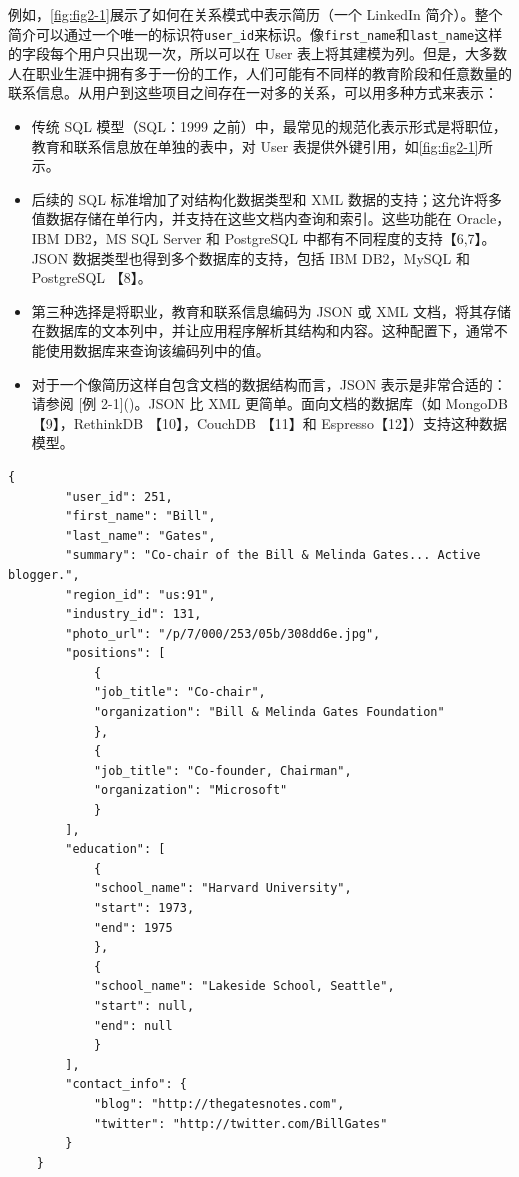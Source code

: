 例如，\autoref{fig:fig2-1}展示了如何在关系模式中表示简历（一个 LinkedIn 简介）。整个简介可以通过一个唯一的标识符\texttt{user\_id}来标识。像\texttt{first\_name}和\texttt{last\_name}这样的字段每个用户只出现一次，所以可以在 User 表上将其建模为列。但是，大多数人在职业生涯中拥有多于一份的工作，人们可能有不同样的教育阶段和任意数量的联系信息。从用户到这些项目之间存在一对多的关系，可以用多种方式来表示：

\begin{itemize}
    \item 传统 SQL 模型（SQL：1999 之前）中，最常见的规范化表示形式是将职位，教育和联系信息放在单独的表中，对 User 表提供外键引用，如\autoref{fig:fig2-1}所示。
    \item 后续的 SQL 标准增加了对结构化数据类型和 XML 数据的支持；这允许将多值数据存储在单行内，并支持在这些文档内查询和索引。这些功能在 Oracle，IBM DB2，MS SQL Server 和 PostgreSQL 中都有不同程度的支持【6,7】。JSON 数据类型也得到多个数据库的支持，包括 IBM DB2，MySQL 和 PostgreSQL 【8】。
    \item 第三种选择是将职业，教育和联系信息编码为 JSON 或 XML 文档，将其存储在数据库的文本列中，并让应用程序解析其结构和内容。这种配置下，通常不能使用数据库来查询该编码列中的值。
    \item 对于一个像简历这样自包含文档的数据结构而言，JSON 表示是非常合适的：请参阅 [例 2-1]()。JSON 比 XML 更简单。面向文档的数据库（如 MongoDB 【9】，RethinkDB 【10】，CouchDB 【11】和 Espresso【12】）支持这种数据模型。
\end{itemize}

\begin{lstlisting}[caption={用 JSON 文档表示一个 LinkedIn 简介}, breaklines]
    {
        "user_id": 251,
        "first_name": "Bill",
        "last_name": "Gates",
        "summary": "Co-chair of the Bill & Melinda Gates... Active blogger.",
        "region_id": "us:91",
        "industry_id": 131,
        "photo_url": "/p/7/000/253/05b/308dd6e.jpg",
        "positions": [
            {
            "job_title": "Co-chair",
            "organization": "Bill & Melinda Gates Foundation"
            },
            {
            "job_title": "Co-founder, Chairman",
            "organization": "Microsoft"
            }
        ],
        "education": [
            {
            "school_name": "Harvard University",
            "start": 1973,
            "end": 1975
            },
            {
            "school_name": "Lakeside School, Seattle",
            "start": null,
            "end": null
            }
        ],
        "contact_info": {
            "blog": "http://thegatesnotes.com",
            "twitter": "http://twitter.com/BillGates"
        }
    }
\end{lstlisting}

